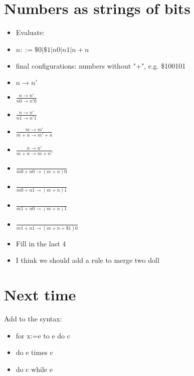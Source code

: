 \documentclass{article}
\begin{document}
\section{Numbers as strings of bits}
\begin{itemize}
	\item Evaluate:
	\item $n::=\$0|\$1|n 0|n 1|n + n$
	\item final configurations: numbers without "+", e.g. \$100101
	\item $ n\rightarrow n' $
	\item $\frac{n\rightarrow n'}{n0\rightarrow n'0}$
	\item $\frac{n\rightarrow n'}{n1\rightarrow n'1}$
	\item $\frac{m\rightarrow m'}{m+n\rightarrow m'+n}$
	\item $\frac{n\rightarrow n'}{m+n\rightarrow m+n'}$
	\item $\frac{}{m0+n0\rightarrow (m+n)0}$
	\item $\frac{}{m0+n1\rightarrow (m+n)1}$
	\item $\frac{}{m1+n0\rightarrow (m+n)1}$
	\item $\frac{}{m1+n1\rightarrow (m+n+\$1)0}$
	\item Fill in the last 4
	\item I think we should add a rule to merge two doll
\end{itemize}
\section{Next time}
Add to the syntax:
\begin{itemize}
	\item for x:=e to e do c 
	\item do e times c
	\item do c while e
\end{itemize}
\end{document}
